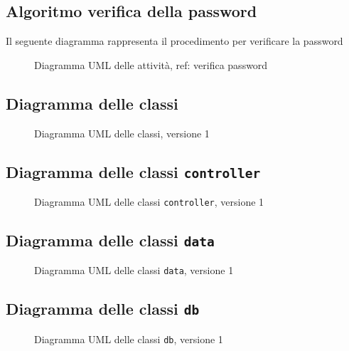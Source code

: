 \pagebreak
\subsection{Algoritmo verifica della password}
Il seguente diagramma rappresenta il procedimento per verificare la password
\vspace{0.5cm}
\begin{figure}[H]
    \centering
    \caption{Diagramma UML delle attività, ref: verifica password}
    \label{fig:activity_user_password}
\end{figure}

\pagebreak
\subsection{Diagramma delle classi}
\vspace{0.5cm}
\begin{figure}[H]
    \centering
    \caption{Diagramma UML delle classi, versione 1}
    \label{fig:class_v_1}
\end{figure}

\subsection{Diagramma delle classi \texttt{controller}}
\vspace{0.5cm}
\begin{figure}[H]
    \centering
    \caption{Diagramma UML delle classi \texttt{controller}, versione 1}
    \label{fig:class_controller_v_1}
\end{figure}

\subsection{Diagramma delle classi \texttt{data}}
\vspace{0.5cm}
\begin{figure}[H]
    \centering
    \caption{Diagramma UML delle classi \texttt{data}, versione 1}
    \label{fig:class_data_v_1}
\end{figure}

\subsection{Diagramma delle classi \texttt{db}}
\vspace{0.5cm}
\begin{figure}[H]
    \centering
    \caption{Diagramma UML delle classi \texttt{db}, versione 1}
    \label{fig:class_db_v_1}
\end{figure}


